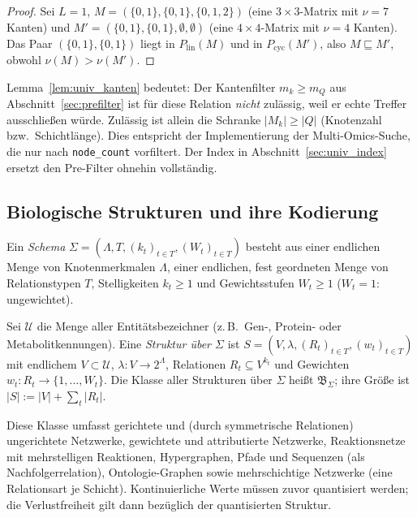 \begin{proof}
	Sei $L=1$, $M=(\{0,1\},\{0,1\},\{0,1,2\})$ (eine $3\times3$-Matrix mit $\nu=7$ Kanten) und $M'=(\{0,1\},\{0,1\},\emptyset,\emptyset)$ (eine $4\times4$-Matrix mit $\nu=4$ Kanten). Das Paar $(\{0,1\},\{0,1\})$ liegt in $P_{\mathrm{lin}}(M)$ und in $P_{\mathrm{cyc}}(M')$, also $M\sqsubseteq M'$, obwohl $\nu(M)>\nu(M')$.
\end{proof}

\begin{bemerkung}
	Lemma~\ref{lem:univ_kanten} bedeutet: Der Kantenfilter $m_k\ge m_Q$ aus Abschnitt~\ref{sec:prefilter} ist für diese Relation \emph{nicht} zulässig, weil er echte Treffer ausschließen würde. Zulässig ist allein die Schranke $|M_k|\ge|Q|$ (Knotenzahl bzw.\ Schichtlänge). Dies entspricht der Implementierung der Multi-Omics-Suche, die nur nach \texttt{node\_count} vorfiltert. Der Index in Abschnitt~\ref{sec:univ_index} ersetzt den Pre-Filter ohnehin vollständig.
\end{bemerkung}

\subsection{Biologische Strukturen und ihre Kodierung}
\label{sec:univ_kodierung}

\begin{definition}[Schema]
	Ein \emph{Schema} $\Sigma=(\Lambda,T,(k_t)_{t\in T},(W_t)_{t\in T})$ besteht aus einer endlichen Menge von Knotenmerkmalen $\Lambda$, einer endlichen, fest geordneten Menge von Relationstypen $T$, Stelligkeiten $k_t\ge1$ und Gewichtsstufen $W_t\ge1$ ($W_t=1$: ungewichtet).
\end{definition}

\begin{definition}[Struktur]
	Sei $\mathcal{U}$ die Menge aller Entitätsbezeichner (z.\,B.\ Gen-, Protein- oder Metabolitkennungen). Eine \emph{Struktur über $\Sigma$} ist $S=(V,\lambda,(R_t)_{t\in T},(w_t)_{t\in T})$ mit endlichem $V\subset\mathcal{U}$, $\lambda:V\to 2^{\Lambda}$, Relationen $R_t\subseteq V^{k_t}$ und Gewichten $w_t:R_t\to\{1,\dots,W_t\}$. Die Klasse aller Strukturen über $\Sigma$ heißt $\mathfrak{B}_\Sigma$; ihre Größe ist $|S|:=|V|+\sum_t|R_t|$.
\end{definition}

Diese Klasse umfasst gerichtete und (durch symmetrische Relationen) ungerichtete Netzwerke, gewichtete und attributierte Netzwerke, Reaktionsnetze mit mehrstelligen Reaktionen, Hypergraphen, Pfade und Sequenzen (als Nachfolgerrelation), Ontologie-Graphen sowie mehrschichtige Netzwerke (eine Relationsart je Schicht). Kontinuierliche Werte müssen zuvor quantisiert werden; die Verlustfreiheit gilt dann bezüglich der quantisierten Struktur.


